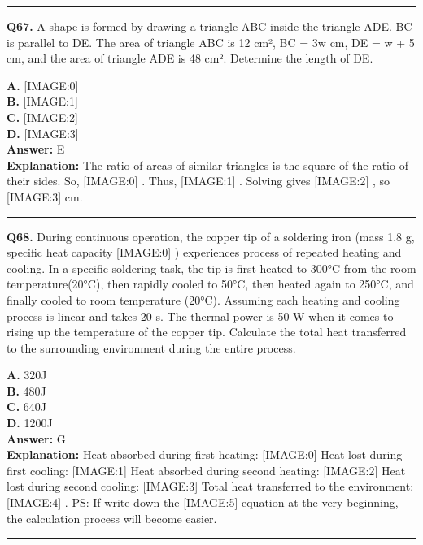 \documentclass[12pt]{article}
\begin{document}
\hrule
\vspace{1em}


\noindent
\textbf{Q67.} A shape is formed by drawing a triangle ABC inside the triangle ADE. BC is parallel to DE. The area of triangle ABC is 12 cm², BC = 3w cm, DE = w + 5 cm, and the area of triangle ADE is 48 cm².
Determine the length of DE.



\textbf{A.} [IMAGE:0] \\
\textbf{B.} [IMAGE:1] \\
\textbf{C.} [IMAGE:2] \\
\textbf{D.} [IMAGE:3] \\

\textbf{Answer:} E \\
\textbf{Explanation:} The ratio of areas of similar triangles is the square of the ratio of their sides. So,
[IMAGE:0]
. Thus,
[IMAGE:1]
. Solving gives
[IMAGE:2]
, so
[IMAGE:3]
cm.

\hrule
\vspace{1em}


\noindent
\textbf{Q68.} During continuous operation, the copper tip of a soldering iron (mass 1.8 g, specific heat capacity
[IMAGE:0]
) experiences process of repeated heating and cooling. In a specific soldering task, the tip is first heated to 300°C from the room temperature(20°C), then rapidly cooled to 50°C, then heated again to 250°C, and finally cooled to room temperature (20°C). Assuming each heating and cooling process is linear and takes 20 s. The thermal power is 50 W when it comes to rising up the temperature of the copper tip.
Calculate the total heat transferred to the surrounding environment during the entire process.



\textbf{A.} 320J \\
\textbf{B.} 480J \\
\textbf{C.} 640J \\
\textbf{D.} 1200J \\

\textbf{Answer:} G \\
\textbf{Explanation:} Heat absorbed during first heating:
[IMAGE:0]
Heat lost during first cooling:
[IMAGE:1]
Heat absorbed during second heating:
[IMAGE:2]
Heat lost during second cooling:
[IMAGE:3]
Total heat transferred to the environment:
[IMAGE:4]
.
PS: If write down the
[IMAGE:5]
equation at the very beginning, the calculation process will become easier.

\hrule
\vspace{1em}
\end{document}
